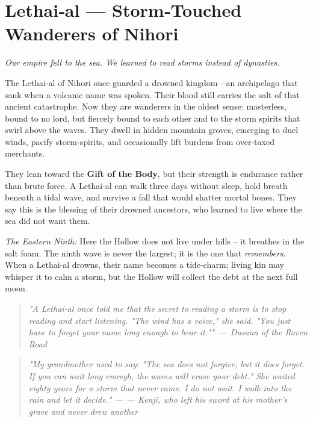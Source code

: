 \documentclass[12pt]{book}
\newcommand{\dusana}[1]{%
    \begin{quote}\itshape #1 ---~Dusana of the Raven Road\end{quote}}
\newcommand{\letter}[2]{%
    \begin{quote}\small\itshape #1 \hfill --- #2\end{quote}}
\begin{document}
\section{Lethai‑al --- Storm‑Touched Wanderers of Nihori}

\noindent \textit{Our empire fell to the sea. We learned to read storms instead of dynasties.}

The Lethai‑al of Nihori once guarded a drowned kingdom---an archipelago that sank when a volcanic name was spoken. Their blood still carries the salt of that ancient catastrophe. Now they are wanderers in the oldest sense: masterless, bound to no lord, but fiercely bound to each other and to the storm spirits that swirl above the waves. They dwell in hidden mountain groves, emerging to duel winds, pacify storm‑spirits, and occasionally lift burdens from over‑taxed merchants.

They lean toward the \textbf{Gift of the Body}, but their strength is endurance rather than brute force. A Lethai‑al can walk three days without sleep, hold breath beneath a tidal wave, and survive a fall that would shatter mortal bones. They say this is the blessing of their drowned ancestors, who learned to live where the sea did not want them.

\vspace{0.5em}
\noindent\textit{The Eastern Ninth:} Here the Hollow does not live under hills – it breathes in the salt foam. The ninth wave is never the largest; it is the one that \emph{remembers}. When a Lethai‑al drowns, their name becomes a tide‑charm; living kin may whisper it to calm a storm, but the Hollow will collect the debt at the next full moon.

\vspace{0.5em}
\dusana{"A Lethai‑al once told me that the secret to reading a storm is to stop reading and start listening. "The wind has a voice," she said. "You just have to forget your name long enough to hear it.""}

\letter{"My grandmother used to say: "The sea does not forgive, but it does forget. If you can wait long enough, the waves will erase your debt." She waited eighty years for a storm that never came. I do not wait. I walk into the rain and let it decide."}{--- Kenji, who left his sword at his mother's grave and never drew another}
\end{document}
